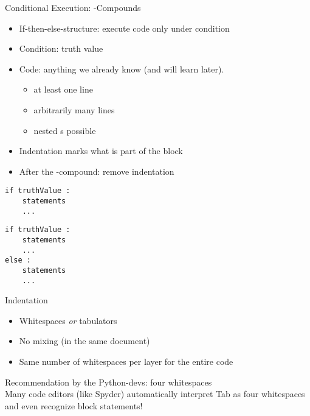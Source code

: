 \begin{frame}[fragile]{Conditional Execution: -Compounds}
%
\begin{minipage}[t]{.49\linewidth}
\begin{itemize}
\item If-then-else-structure: execute code only under condition
\item Condition: truth value
\item Code: anything we already know (and will learn later).
	\begin{itemize}
	\item at least one line
	\item arbitrarily many lines
	\item nested s possible
	\end{itemize}
\item Indentation marks what is part of the block
\item After the -compound: remove indentation
\end{itemize}
\end{minipage}
%
\begin{minipage}[t]{.49\linewidth}
\phantom{x}
\begin{codebox}
\begin{verbatim}
if truthValue :
    statements
    ...
\end{verbatim}
\end{codebox}
%
\begin{codebox}
\begin{verbatim}
if truthValue :
    statements
    ...
else :
    statements
    ...
\end{verbatim}
\end{codebox}
\end{minipage}
%
\end{frame}


\begin{frame}{Indentation}
%
\begin{itemize}
\item Whitespaces \emph{or} tabulators
\item No mixing (in the same document)
\item Same number of whitespaces per layer for the entire code
\end{itemize}
%
\begin{hintbox}
Recommendation by the Python-devs: four whitespaces\\
Many code editors (like Spyder) automatically interpret Tab as four whitespaces and even recognize block statements!
\end{hintbox}
%
\end{frame}

